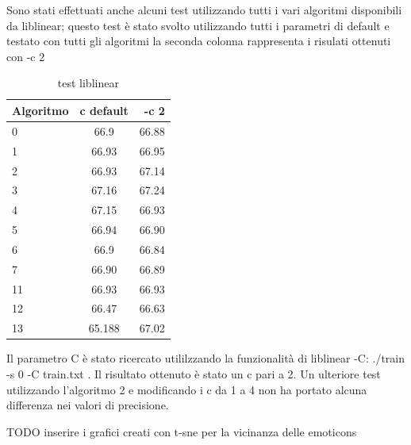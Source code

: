 \documentclass[a4paper,12pt,openright,twoside]{report}
\theoremstyle{definition}
\begin{document}
Sono stati effettuati anche alcuni test utilizzando tutti i vari algoritmi disponibili da liblinear; questo test è stato svolto utilizzando tutti i parametri di default e testato con tutti gli algoritmi la seconda colonna rappresenta i risulati ottenuti con -c 2
\begin{table}[h]
\begin{center}
\begin{tabular}{|l|c|r|}
\hline
Algoritmo & c  default & -c 2 \\
\hline
\hline
0 & 66.9 & 66.88\\
\hline
1 & 66.93 & 66.95\\
\hline
2 & 66.93 & 67.14\\
\hline
3 & 67.16 & 67.24\\
\hline
4 & 67.15 & 66.93\\
\hline
5 & 66.94 & 66.90\\
\hline
6 & 66.9 & 66.84\\
\hline
7 & 66.90 & 66.89\\
\hline
11 & 66.93 & 66.93\\
\hline
12 & 66.47 & 66.63\\
\hline
13 & 65.188 & 67.02\\
\hline
\end{tabular}
\end{center}
\caption{test liblinear}
\label{tab:liblineraTest1}
\end{table}

Il parametro C è stato ricercato utililzzando la funzionalità di liblinear -C: ./train -s 0 -C train.txt . Il risultato ottenuto è stato un c pari a 2. Un ulteriore test utilizzando l'algoritmo 2 e modificando i c da 1 a 4 non ha portato alcuna differenza nei valori di precisione.

TODO inserire i grafici creati con t-sne per la vicinanza delle emoticons
\end{document}
